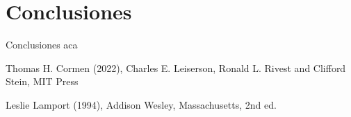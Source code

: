 \documentclass{article}
\begin{document}
    \section{Conclusiones}\label{sec:conclusiones}
            Conclusiones aca
    
	
	
    
    \begin{thebibliography}{2}
            Thomas H. Cormen (2022), Charles E. Leiserson, Ronald L. Rivest and Clifford Stein, MIT Press
    
            Leslie Lamport (1994), Addison
            Wesley, Massachusetts, 2nd ed.
            
    \end{thebibliography}
	
\end{document}
